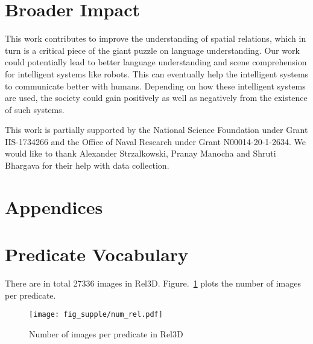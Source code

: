 \documentclass{article}
\newcommand{\smallsec}[1]{\noindent {\bf #1.}}
\begin{document}
\section{Broader Impact}
This work contributes to improve the understanding of spatial relations, which in turn is a critical piece of the giant puzzle on language understanding. Our work could potentially lead to better language understanding and scene comprehension for intelligent systems like robots. This can eventually help the intelligent systems to communicate better with humans. Depending on how these intelligent systems are used, the society could gain positively as well as negatively from the existence of such systems.

\smallsec{Acknowledgement} This work is partially supported by the National Science Foundation under Grant IIS-1734266 and the Office of Naval Research under Grant N00014-20-1-2634. We would like to thank Alexander Strzalkowski, Pranay Manocha and Shruti Bhargava for their help with data collection.

\clearpage
\appendix
\section*{Appendices}
\renewcommand{\thesubsection}{\Alph{subsection}}

\section{Predicate Vocabulary}
There are in total 27336 images in Rel3D. Figure.~\ref{fig:num_images} plots the number of images per predicate.
\begin{figure}[h]
    \centering
    \texttt{[image: fig\_supple/num\_rel.pdf]}
    \caption{Number of images per predicate in Rel3D}
    \label{fig:num_images}
\end{figure}
\end{document}
